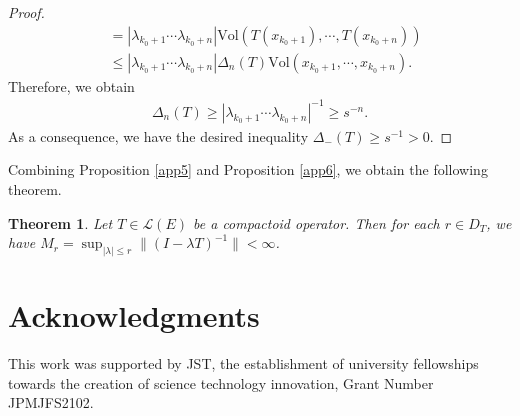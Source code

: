 \documentclass[12pt]{amsart}
\theoremstyle{plain}
\newtheorem{thm}[prop] {Theorem}
\theoremstyle{definition}
\begin{document}
\begin{proof}
\begin{align*}
    &= |\lambda_{k_0 +1} \cdots \lambda_{k_0 + n}|\text{Vol}(T(x_{k_0+1}), \cdots, T(x_{k_0+n})) \\
    &\le |\lambda_{k_0 +1} \cdots \lambda_{k_0 + n}| \Delta_{n}(T) \text{Vol}(x_{k_0+1}, \cdots, x_{k_0+n}).
  \end{align*}
  Therefore, we obtain
  \begin{align*}
    \Delta_{n}(T) \ge |\lambda_{k_0 +1} \cdots \lambda_{k_0 + n}|^{-1} \ge s^{-n}.
  \end{align*}
  As a consequence, we have the desired inequality $\Delta_{-}(T) \ge s^{-1} > 0$.
\end{proof}  

Combining Proposition \ref{app5} and Proposition \ref{app6}, we obtain the following theorem.

\begin{thm} \label{app7}
  Let $T \in \mathcal{L}(E)$ be a compactoid operator. Then for each $r \in D_T$, we have $M_r = \sup_{|\lambda| \le r} \|(I - \lambda T)^{-1}\| < \infty$.
\end{thm}

\section*{Acknowledgments}
 This work was supported by JST, the establishment of university fellowships
towards the creation of science technology innovation, Grant Number JPMJFS2102.
\end{document}
